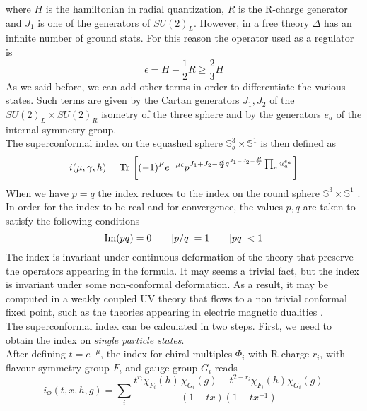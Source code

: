  where $H$ is the hamiltonian in radial quantization, $R$ is the R-charge generator and $J_1$ is one of the generators of $SU(2)_L$. 
 However, in a free theory $\Delta$ has an infinite number of ground stats. 
 For this reason the operator used as a regulator is \cite{Romelsberger:2005eg}
 \begin{equation}
 	\epsilon = H - \frac{1}{2} R \geq \frac{2}{3} H 
 \end{equation}
As we said before, we can add other terms in order to differentiate the various states.
Such terms are given by the Cartan generators $J_1, J_2$ of the $SU(2)_L \times SU(2)_R$ isometry of the three sphere and by the generators $e_a$ of the internal symmetry group.\\
The superconformal index on the squashed sphere $\mathbb{S}_b^3 \times \mathbb{S}^1$ is then defined as \cite{Aharony:2013dha}
\begin{equation}
 i( \mu, \gamma,h) =
  \mathrm{Tr } \,  \left[  (-1)^F e^{ - \mu \epsilon } p^{J_1 + J_2 - \frac{R}{2} q^{J_1 - J_2 - \frac{R}{2}} \prod_a u_a^{e_a} }   \right]
 \end{equation} 
When we have $p=q$ the index reduces to the index on the round sphere $\mathbb{S}^3 \times \mathbb{S}^1$ \cite{Dolan:2008qi}.\\
In order for the index to be real and for convergence, the values $p,q$ are taken to satisfy the following conditions
\begin{equation}
\hbox{Im} (pq) =0 \qquad |p/q| = 1 \qquad | pq| < 1
\end{equation}
The index is invariant under continuous deformation of the theory that preserve the operators appearing in the formula.
It may seems a trivial fact, but the index is invariant under some non-conformal deformation.
As a result, it may be computed in a weakly coupled UV theory that flows to a non trivial conformal fixed point, such as the theories appearing in electric magnetic dualities \cite{Romelsberger:2007ec}. \\
The superconformal index can be calculated in two steps.
First, we need to obtain the index on \emph{single particle states}.\\
After defining $t = e^{-\mu}$, the index for chiral multiples $\Phi_i$ with R-charge $r_i$, with flavour symmetry group $F_i$ and gauge group $G_i$ reads
\begin{equation}
i_{\Phi}(t,x,h,g) = \sum_{i} \frac{ t^{r_i} \chi_{F_i}(h) \, \chi_{G_i}(g) - t^{2-r_i} \chi_{\bar{F}_i}(h) \chi_{\bar{G}_i}(g)}{ (1-tx) (1- t x^{-1})}
\end{equation}

